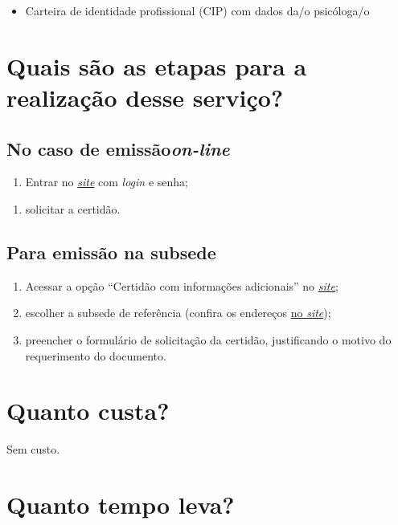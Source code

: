 \begin{itemize}
  \item  Carteira de identidade profissional (CIP) com dados da/o psicóloga/o
\end{itemize}

\section{Quais são as etapas para a realização desse serviço?}

\subsection{\texorpdfstring{No caso de emissão\emph{on-line}}{No caso de emissão on-line}}

\begin{enumerate}
  \item  Entrar no  \href{https://cfpsp.brctotal.com/crp06_servicosonline/pgsRequerimento/Requerimentos.aspx}{\emph{site}}  com \emph{login} e senha;
\end{enumerate}

\begin{enumerate}
  \item  solicitar a certidão.
\end{enumerate}

\subsection{Para emissão na subsede}

\begin{enumerate}
  \item  Acessar a opção ``Certidão com informações adicionais'' no  \href{https://www.crpsp.org/pagina/view/326}{\emph{site}};
  \item  escolher a subsede de referência (confira os endereços  \href{https://www.crpsp.org/sede/index}{no \emph{site}});
  \item  preencher o formulário de solicitação da certidão, justificando o  motivo do requerimento do documento.
\end{enumerate}

\section{Quanto custa?}

Sem custo.

\section{Quanto tempo leva?}


